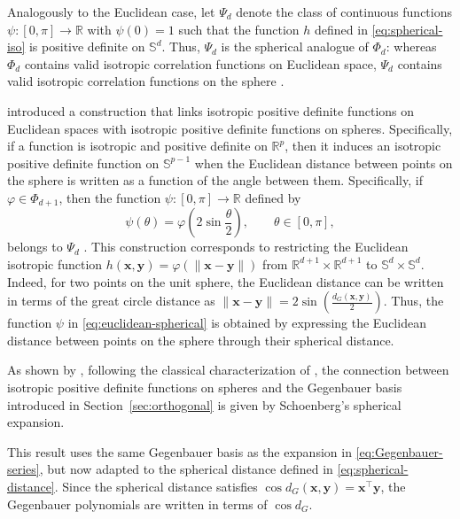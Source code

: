 \documentclass[12pt]{report} %
\newcommand{\bx}{\mathbf{x}}
\newcommand{\by}{\mathbf{y}}
\newcommand{\Sd}{\mathbb{S}^{d}}
\begin{document}
Analogously to the Euclidean case, let $\Psi_d$ denote the class of continuous
functions $\psi:[0,\pi]\to\mathbb{R}$ with $\psi(0)=1$ such that the function
$h$ defined in \eqref{eq:spherical-iso} is positive definite on
$\Sd$. Thus, $\Psi_d$ is the spherical analogue of $\Phi_d$:
whereas $\Phi_d$ contains valid isotropic correlation functions on Euclidean
space, $\Psi_d$ contains valid isotropic correlation functions on the sphere
\citep{Gneiting2013}.

\citet{Yadrenko1983} introduced a construction that links isotropic positive
definite functions on Euclidean spaces with isotropic positive definite
functions on spheres. Specifically, if a function is isotropic and positive definite on $\mathbb{R}^p$, then it induces an isotropic positive definite function on $\mathbb{S}^{p-1}$ when the Euclidean distance between points on the sphere is written as a function of the angle between them. Specifically, if $\varphi\in\Phi_{d+1}$, then the function $\psi:[0,\pi]\to\mathbb{R}$ defined by
\begin{equation}
    \label{eq:euclidean-spherical}
    \psi(\theta) =
    \varphi\!\left(2\sin\frac{\theta}{2}\right),
    \qquad \theta\in[0,\pi],
\end{equation}
belongs to $\Psi_d$ \citep{Gneiting2013}. This construction corresponds to restricting the Euclidean isotropic function $ h(\bx,\by) = \varphi(\|\bx-\by\|)$ from $\mathbb{R}^{d+1}\times\mathbb{R}^{d+1}$ to $\mathbb{S}^d\times\mathbb{S}^d$. Indeed, for two points on the unit sphere, the Euclidean distance can be written in terms of the great circle distance as $ \|\bx-\by\| = 2\sin\left(\frac{d_{G}(\bx,\by)}{2}\right)$. Thus, the function $\psi$ in \eqref{eq:euclidean-spherical} is obtained by expressing the Euclidean distance between points on the sphere through their spherical distance.

As shown by \citet[Theorem~1]{Gneiting2013}, following the classical characterization of \citet{Schoenberg1942}, the connection between isotropic positive definite functions on spheres and the Gegenbauer basis introduced in Section~\ref{sec:orthogonal} is given by Schoenberg's spherical expansion.

This result uses the same Gegenbauer basis as the expansion in \eqref{eq:Gegenbauer-series}, but now adapted to the spherical distance defined in \eqref{eq:spherical-distance}. Since the spherical distance satisfies $\cos d_{G}(\bx,\by)=\bx^\top\by$, the Gegenbauer polynomials are written in terms of $\cos d_{G}$.
\end{document}
